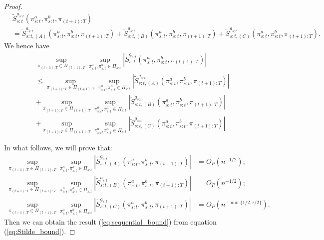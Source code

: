 \begin{proof}
\begin{align*}
    &\widetilde{S}_{s:t}^{\underline{a}_{s:t}}(\pi_{s:t}^{a},\pi_{s:t}^{b},\pi_{(t+1):T}) \\
    &= \widetilde{S}_{s:t,(A)}^{\underline{a}_{s:t}}(\pi_{s:t}^{a},\pi_{s:t}^{b},\pi_{(t+1):T}) 
    + \widetilde{S}_{s:t,(B)}^{\underline{a}_{s:t}}(\pi_{s:t}^{a},\pi_{s:t}^{b},\pi_{(t+1):T})  
    + \widetilde{S}_{s:t,(C)}^{\underline{a}_{s:t}}(\pi_{s:t}^{a},\pi_{s:t}^{b},\pi_{(t+1):T}).
\end{align*}
We hence have 
\begin{align}
        &\sup_{\pi_{(t+1):T} \in  \Pi_{(t+1):T}}\sup_{\pi_{s:t}^{a},\pi_{s:t}^{a}\in \Pi_{s:t}} \left| \widetilde{S}_{s:t}^{\underline{a}_{s:t}}(\pi_{s:t}^{a},\pi_{s:t}^{b},\pi_{(t+1):T})\right| \nonumber \\
        & \leq  \sup_{\pi_{(t+1):T} \in  \Pi_{(t+1):T}}\sup_{\pi_{s:t}^{a},\pi_{s:t}^{a}\in \Pi_{s:t}} \left| \widetilde{S}_{s:t,(A)}^{\underline{a}_{s:t}}(\pi_{s:t}^{a},\pi_{s:t}^{b},\pi_{(t+1):T})\right| \nonumber \\
        &+ \sup_{\pi_{(t+1):T} \in  \Pi_{(t+1):T}}\sup_{\pi_{s:t}^{a},\pi_{s:t}^{a}\in \Pi_{s:t}} \left| \widetilde{S}_{s:t,(B)}^{\underline{a}_{s:t}}(\pi_{s:t}^{a},\pi_{s:t}^{b},\pi_{(t+1):T})\right| \nonumber \\
        &+ \sup_{\pi_{(t+1):T} \in  \Pi_{(t+1):T}}\sup_{\pi_{s:t}^{a},\pi_{s:t}^{a}\in \Pi_{s:t}} \left| \widetilde{S}_{s:t,(C)}^{\underline{a}_{s:t}}(\pi_{s:t}^{a},\pi_{s:t}^{b},\pi_{(t+1):T})\right|  \label{eq:Stilde_bound}
\end{align}

In what follows, we will prove that:
\begin{align}
    \sup_{\pi_{(t+1):T} \in  \Pi_{(t+1):T}}\sup_{\pi_{s:t}^{a},\pi_{s:t}^{a}\in \Pi_{s:t}} \left| \widetilde{S}_{s:t,(A)}^{\underline{a}_{s:t}}(\pi_{s:t}^{a},\pi_{s:t}^{b},\pi_{(t+1):T})\right| &= O_{P}\left(n^{-1/2}\right); \label{eq:S_tilde_A_bound}\\
    \sup_{\pi_{(t+1):T} \in  \Pi_{(t+1):T}}\sup_{\pi_{s:t}^{a},\pi_{s:t}^{a}\in \Pi_{s:t}} \left| \widetilde{S}_{s:t,(B)}^{\underline{a}_{s:t}}(\pi_{s:t}^{a},\pi_{s:t}^{b},\pi_{(t+1):T})\right| &= O_{P}\left(n^{-1/2}\right); \label{eq:S_tilde_B_bound}\\
    \sup_{\pi_{(t+1):T} \in  \Pi_{(t+1):T}}\sup_{\pi_{s:t}^{a},\pi_{s:t}^{a}\in \Pi_{s:t}} \left| \widetilde{S}_{s:t,(C)}^{\underline{a}_{s:t}}(\pi_{s:t}^{a},\pi_{s:t}^{b},\pi_{(t+1):T})\right| &= O_{P}\left(n^{-\min\{1/2,\tau/2\}}\right). \label{eq:S_tilde_C_bound}
\end{align}
Then we can obtain the result (\ref{eq:sequential_bound}) from equation (\ref{eq:Stilde_bound}).


\end{proof}
